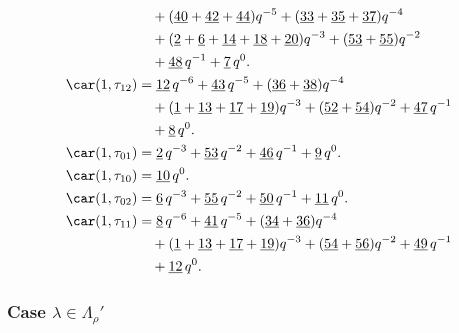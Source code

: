\begin{align*}
	&\quad+(\underline{40}+\underline{42}+\underline{44})q^{-5}+(\underline{33}+\underline{35}+\underline{37})q^{-4}\\
	&\quad+(\underline{2}+\underline{6}+\underline{14}+\underline{18}+\underline{20})q^{-3}+(\underline{53}+\underline{55})q^{-2}\\
	&\quad+\underline{48}\,q^{-1}+\underline{7}\,q^0.\\
	\car(1,\tau_{12})
	&=\underline{12}\,q^{-6}+\underline{43}\,q^{-5}+(\underline{36}+\underline{38})q^{-4}\\
	&\quad+(\underline{1}+\underline{13}+\underline{17}+\underline{19})q^{-3}+(\underline{52}+\underline{54})q^{-2}+\underline{47}\,q^{-1}\\
	&\quad+\underline{8}\,q^0.\\
	\car(1,\tau_{01})
	&=\underline{2}\,q^{-3}+\underline{53}\,q^{-2}+\underline{46}\,q^{-1}+\underline{9}\,q^0.\\
	\car(1,\tau_{10})
	&=\underline{10}\,q^0.\\
	\car(1,\tau_{02})
	&=\underline{6}\,q^{-3}+\underline{55}\,q^{-2}+\underline{50}\,q^{-1}+\underline{11}\,q^0.\\
	\car(1,\tau_{11})
	&=\underline{8}\,q^{-6}+\underline{41}\,q^{-5}+(\underline{34}+\underline{36})q^{-4}\\
	&\quad+(\underline{1}+\underline{13}+\underline{17}+\underline{19})q^{-3}+(\underline{54}+\underline{56})q^{-2}+\underline{49}\,q^{-1}\\
	&\quad+\underline{12}\,q^0.
\end{align*}

\subsubsection{Case $\lambda\in \Lambda_\rho'$}

